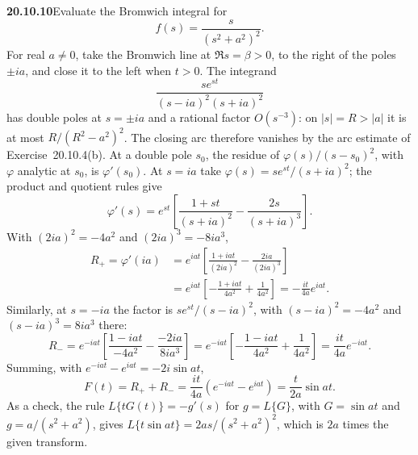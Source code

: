 \par\bigskip
\noindent\textbf{20.10.10}\quad Evaluate the Bromwich integral
for
\[
f(s)=\frac{s}{(s^{2}+a^{2})^{2}}.
\]
\solution
For real $a\ne0$, take the Bromwich line at $\Re s=\beta>0$,
to the right of the poles $\pm ia$, and close it to the left
when $t>0$. The integrand
\[
\frac{se^{st}}{(s-ia)^2(s+ia)^2}
\]
has double poles at $s=\pm ia$ and a rational factor
$O(s^{-3})$: on $|s|=R>|a|$ it is at most $R/(R^2-a^2)^2$.
The closing arc therefore vanishes by the arc estimate of
Exercise~20.10.4(b). At a double pole $s_0$, the residue of
$\varphi(s)/(s-s_0)^2$, with $\varphi$ analytic at $s_0$, is
$\varphi'(s_0)$. At $s=ia$ take $\varphi(s)=se^{st}/(s+ia)^2$;
the product and quotient rules give
\[
\varphi'(s)=e^{st}\left[\frac{1+st}{(s+ia)^2}
-\frac{2s}{(s+ia)^3}\right].
\]
With $(2ia)^2=-4a^2$ and $(2ia)^3=-8ia^3$,
\begin{align*}
R_+=\varphi'(ia)
&=e^{iat}\left[\frac{1+iat}{(2ia)^2}
-\frac{2ia}{(2ia)^3}\right]\\
&=e^{iat}\left[-\frac{1+iat}{4a^2}+\frac1{4a^2}\right]
=-\frac{it}{4a}e^{iat}.
\end{align*}
Similarly, at $s=-ia$ the factor is $se^{st}/(s-ia)^2$, with
$(s-ia)^2=-4a^2$ and $(s-ia)^3=8ia^3$ there:
\[
R_-=e^{-iat}\left[\frac{1-iat}{-4a^2}-\frac{-2ia}{8ia^3}\right]
=e^{-iat}\left[-\frac{1-iat}{4a^2}+\frac1{4a^2}\right]
=\frac{it}{4a}e^{-iat}.
\]
Summing, with $e^{-iat}-e^{iat}=-2i\sin at$,
\[
F(t)=R_++R_-=
\frac{it}{4a}(e^{-iat}-e^{iat})
=\boxed{\frac t{2a}\sin at}.
\]
As a check, the rule $L\{tG(t)\}=-g'(s)$ for $g=L\{G\}$, with
$G=\sin at$ and $g=a/(s^2+a^2)$, gives
$L\{t\sin at\}=2as/(s^2+a^2)^2$, which is $2a$ times the
given transform.

